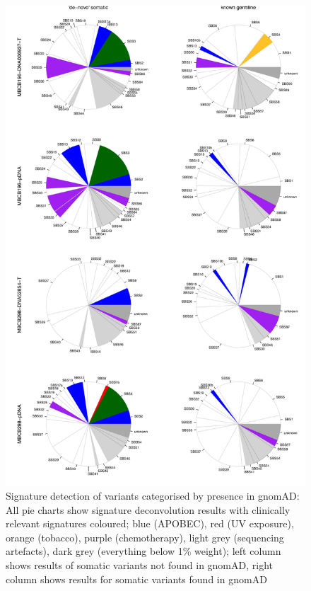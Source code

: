 \begin{figure}[ht]
\centering
\includegraphics[width=.99\linewidth]{Figures/MisMatchFinder/signaturesGermlineSplit.pdf}
\caption[Signature detection of variants categorised by presence in gnomAD]{Signature detection of variants categorised by presence in gnomAD: All pie charts show signature deconvolution results with clinically relevant signatures coloured; blue (APOBEC), red (UV exposure), orange (tobacco), purple (chemotherapy), light grey (sequencing artefacts), dark grey (everything below 1\% weight); left column shows results of somatic variants not found in gnomAD, right column shows results for somatic variants found in gnomAD}\label{A:fig:signaturesGermlineSplit}
\end{figure}


